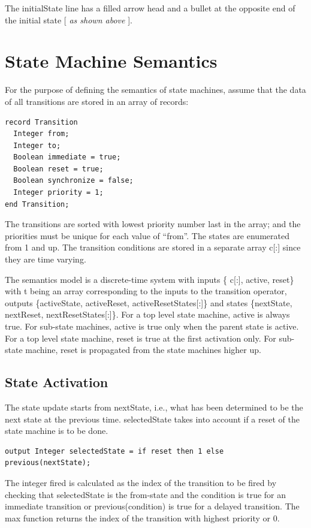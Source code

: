\documentclass[10pt,a4paper]{report}
\def\doublelabel#1{\label{#1}}
\begin{document}
The initialState line has a filled arrow head and a bullet at the
opposite end of the initial state {[} \emph{as shown above} {]}.

\section{State Machine Semantics}\doublelabel{state-machine-semantics}

For the purpose of defining the semantics of state machines, assume that
the data of all transitions are stored in an array of records:

\begin{lstlisting}[language=modelica]
record Transition
  Integer from;
  Integer to;
  Boolean immediate = true;
  Boolean reset = true;
  Boolean synchronize = false;
  Integer priority = 1;
end Transition;
\end{lstlisting}

The transitions are sorted with lowest priority number last in the
array; and the priorities must be unique for each value of ``from''. The
states are enumerated from 1 and up. The transition conditions are
stored in a separate array c{[}:{]} since they are time varying.

  The semantics model is a discrete-time system with inputs \{ c{[}:{]},
  active, reset\} with t being an array corresponding to the inputs to the
  transition operator, outputs \{activeState, activeReset,
  activeResetStates{[}:{]}\} and states \{nextState, nextReset,
  nextResetStates{[}:{]}\}. For a top level state machine, active is
  always true. For sub-state machines, active is true only when the parent
  state is active. For a top level state machine, reset is true at the
  first activation only. For sub-state machine, reset is propagated from
the state machines higher up.

\subsection{State Activation}\doublelabel{state-activation}

The state update starts from nextState, i.e., what has been determined
to be the next state at the previous time. selectedState takes into
account if a reset of the state machine is to be done.

\begin{lstlisting}[language=modelica]
  output Integer selectedState = if reset then 1 else previous(nextState);
\end{lstlisting}
The integer fired is calculated as the index of the transition to be
fired by checking that selectedState is the from-state and the condition
is true for an immediate transition or previous(condition) is true for a
delayed transition. The max function returns the index of the transition
with highest priority or 0.
\end{document}
